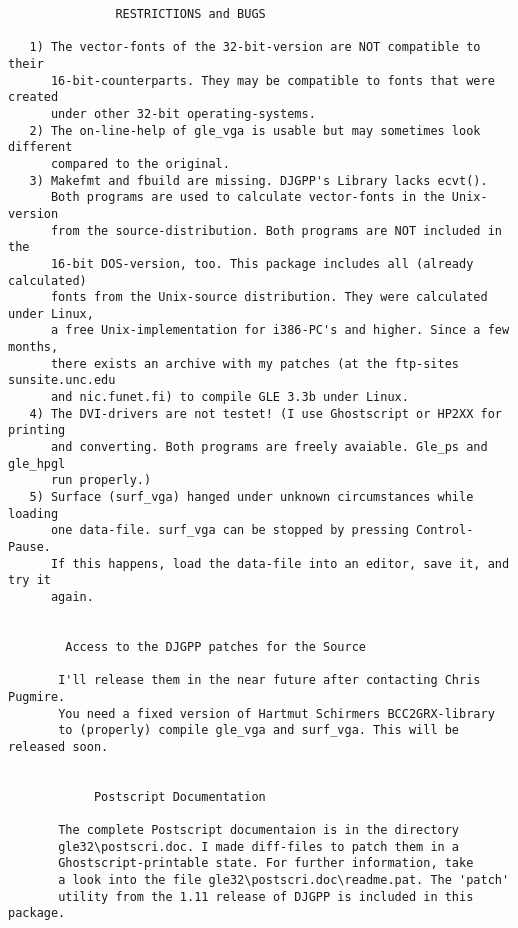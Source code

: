 \begin{center}
\begin{minipage}[t]{11.0cm}
{\scriptsize
\begin{verbatim}
		       RESTRICTIONS and BUGS
		
   1) The vector-fonts of the 32-bit-version are NOT compatible to their
      16-bit-counterparts. They may be compatible to fonts that were created
      under other 32-bit operating-systems.
   2) The on-line-help of gle_vga is usable but may sometimes look different
      compared to the original.
   3) Makefmt and fbuild are missing. DJGPP's Library lacks ecvt().
      Both programs are used to calculate vector-fonts in the Unix-version
      from the source-distribution. Both programs are NOT included in the
      16-bit DOS-version, too. This package includes all (already calculated)
      fonts from the Unix-source distribution. They were calculated under Linux,
      a free Unix-implementation for i386-PC's and higher. Since a few months,
      there exists an archive with my patches (at the ftp-sites sunsite.unc.edu
      and nic.funet.fi) to compile GLE 3.3b under Linux. 
   4) The DVI-drivers are not testet! (I use Ghostscript or HP2XX for printing
      and converting. Both programs are freely avaiable. Gle_ps and gle_hpgl
      run properly.)
   5) Surface (surf_vga) hanged under unknown circumstances while loading
      one data-file. surf_vga can be stopped by pressing Control-Pause.
      If this happens, load the data-file into an editor, save it, and try it
      again.


		Access to the DJGPP patches for the Source

       I'll release them in the near future after contacting Chris Pugmire.
       You need a fixed version of Hartmut Schirmers BCC2GRX-library
       to (properly) compile gle_vga and surf_vga. This will be released soon. 


			Postscript Documentation
			
       The complete Postscript documentaion is in the directory
       gle32\postscri.doc. I made diff-files to patch them in a
       Ghostscript-printable state. For further information, take
       a look into the file gle32\postscri.doc\readme.pat. The 'patch'
       utility from the 1.11 release of DJGPP is included in this package.


\end{verbatim}
}
\end{minipage}
\end{center}
